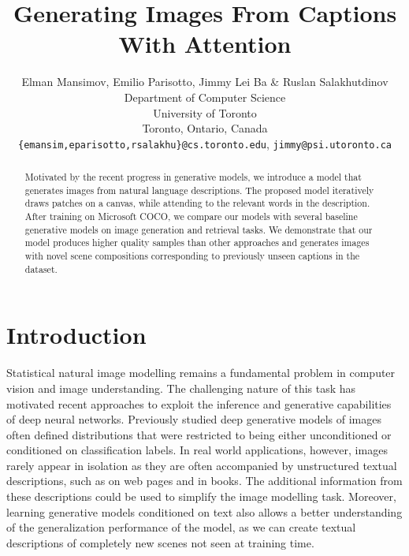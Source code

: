 \documentclass{article} %
\title{Generating Images From Captions\\ With Attention}
\author{
Elman Mansimov, Emilio Parisotto, Jimmy Lei Ba \& Ruslan Salakhutdinov\\
Department of Computer Science\\
University of Toronto\\
Toronto, Ontario, Canada\\
\texttt{\{emansim,eparisotto,rsalakhu\}@cs.toronto.edu}, \texttt{jimmy@psi.utoronto.ca}
}
\begin{document}
\maketitle

\begin{abstract}
Motivated by the recent progress in generative models, we introduce a model that generates images from natural language descriptions. The proposed model iteratively draws patches on a canvas, while attending to the relevant words in the description. After training on Microsoft COCO, we compare our models with several baseline generative models on image generation and retrieval tasks. We demonstrate that our model produces higher quality samples than other approaches and generates images with novel scene compositions corresponding to previously unseen captions in the dataset. 
\end{abstract}

\section{Introduction}
Statistical natural image modelling remains a fundamental problem in computer vision and image understanding. 
The challenging nature of this task has motivated recent approaches to exploit the inference and generative capabilities of deep neural networks.
Previously studied deep generative models of images often defined distributions that were restricted to being either unconditioned or conditioned on classification labels. In real world applications, however, images rarely appear in isolation as they are often accompanied by unstructured textual descriptions, such as on web pages and in books. 
The additional information from these descriptions could be used to simplify the image modelling task. Moreover, learning generative models conditioned on text also allows a better understanding of the generalization performance of the model, as we can create textual descriptions of completely new scenes not seen at training time. 
\end{document}
